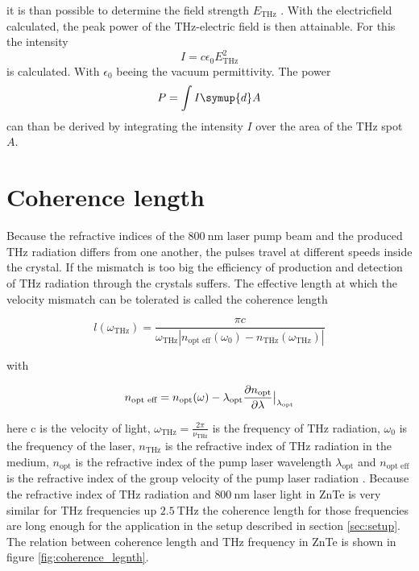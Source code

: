 it is than possible to determine the field strength $E_\text{THz}$ \cite[7]{THZ_eltric_field}.
With the electricfield calculated, the peak power of the $\si{\tera\hertz}$-electric field is then attainable.
For this the intensity
\begin{equation}
    I = c \epsilon_0 E_\text{THz}^2
\end{equation}
is calculated. With $\epsilon_0$ beeing the vacuum permittivity.
The power 
\begin{equation}
    P = \int I \symup{d}A
\end{equation}
can than be derived by integrating the intensity $I$ over the area of the $\si{\tera\hertz}$ spot $A$.


\section{Coherence length}
Because the refractive indices of the $\SI{800}{\nano\meter}$ laser pump beam and the produced $\si{\tera\hertz}$ radiation differs from one another, the pulses travel at different speeds inside the crystal.
If the mismatch is too big the efficiency of production and detection of $\si{\tera\hertz}$ radiation through the crystals suffers.
The effective length at which the velocity mismatch can be tolerated is called the coherence length

\begin{equation}
    l(\omega_{\si{\tera\hertz}}) = \frac{\pi c}{\omega_{\si{\tera\hertz}} \left | n_\text{opt eff}(\omega_0) - n_{\si{\tera\hertz}}(\omega_{\si{\tera\hertz}})\right |}
\end{equation}

with 

\begin{equation}
    n_{\text{opt eff}} = n_\text{opt}(\omega) - \lambda_\text{opt}\frac{\partial n_\text{opt}}{\partial \lambda}\big{|}_{\lambda_\text{opt}}   
\end{equation}

here c is the velocity of light, $\omega_{\si{\tera\hertz}} = \frac{2\pi}{\nu_{\si{\tera\hertz}}}$ is the frequency of $\si{\tera\hertz}$ radiation, $\omega_0$ is the frequency of the laser, $n_{\si{\tera\hertz}}$ is the refractive index of $\si{\tera\hertz}$ radiation in the medium, $n_\text{opt}$ is the refractive index of the pump laser wavelength $\lambda_\text{opt}$ and $n_\text{opt eff}$ is the refractive index of the group velocity of the pump laser radiation \cite[3]{coherence_legnth}.
Because the refractive index of $\si{\tera\hertz}$ radiation and $\SI{800}{\nano\meter}$ laser light in ZnTe is very similar for $\si{\tera\hertz}$ frequencies up $\SI{2.5}{\tera\hertz}$ \cite{coherence_legnth} the coherence length for those frequencies are long enough for the application in the setup described in section \ref{sec:setup}.
The relation between coherence length and $\si{\tera\hertz}$ frequency in ZnTe is shown in figure \ref{fig:coherence_legnth}.

